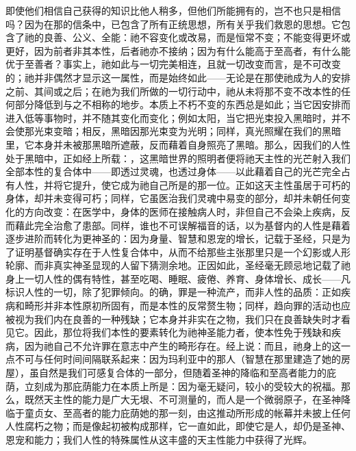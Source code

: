 即使他们相信自己获得的知识比他人稍多，但他们所能拥有的，岂不也只是相信吗？因为在那的信条中，已包含了所有正统思想，所有关乎我们救恩的思想。它包含了祂的良善、公义、全能：祂不容变化或改易，而是恒常不变；不能变得更坏或更好，因为前者非其本性，后者祂亦不接纳；因为有什么能高于至高者，有什么能优于至善者？事实上，祂如此与一切完美相连，且就一切改变而言，是不可改变的；祂并非偶然才显示这一属性，而是始终如此——无论是在那使祂成为人的安排之前、其间或之后；在祂为我们所做的一切行动中，祂从未将那不变不改本性的任何部分降低到与之不相称的地步。本质上不朽不变的东西总是如此；当它因安排而进入低等事物时，并不随其变化而变化；例如太阳，当它把光束投入黑暗时，并不会使那光束变暗；相反，黑暗因那光束变为光明；同样，真光照耀在我们的黑暗里，它本身并未被那黑暗所遮蔽，反而藉着自身照亮了黑暗。那么，因我们的人性处于黑暗中，正如经上所载：，这黑暗世界的照明者便将祂天主性的光芒射入我们全部本性的复合体中——即透过灵魂，也透过身体——以此藉着自己的光芒完全占有人性，并将它提升，使它成为祂自己所是的那一位。正如这天主性虽居于可朽的身体，却并未变得可朽；同样，它虽医治我们灵魂中易变的部分，却并未朝任何变化的方向改变：在医学中，身体的医师在接触病人时，非但自己不会染上疾病，反而藉此完全治愈了患部。同样，谁也不可误解福音的话，以为基督内的人性是藉着逐步进阶而转化为更神圣的：因为身量、智慧和恩宠的增长，记载于圣经，只是为了证明基督确实存在于人性复合体中，从而不给那些主张那里只是一个幻影或人形轮廓、而非真实神圣显现的人留下猜测余地。正因如此，圣经毫无顾忌地记载了祂身上一切人性的偶有特性，甚至吃喝、睡眠、疲倦、养育、身体增长、成长——凡标识人性的一切，除了犯罪倾向。的确，罪是一种流产，而非人性的品质：正如疾病和畸形并非本性原初所固有，而是本性的反常赘生物；同样，趋向罪的活动也应被视为我们内在良善的一种残缺；它本身并非实在之物，我们只在良善缺失时才看见它。因此，那位将我们本性的要素转化为祂神圣能力者，使本性免于残缺和疾病，因为祂自己不允许罪在意志中产生的畸形存在。经上说：而且，祂身上的这一点不可与任何时间间隔联系起来：因为玛利亚中的那人（智慧在那里建造了她的房屋），虽自然是我们可感复合体的一部分，但随着圣神的降临和至高者能力的庇荫，立刻成为那庇荫能力在本质上所是：因为毫无疑问，较小的受较大的祝福。那么，既然天主性的能力是广大无垠、不可测量的，而人是一个微弱原子，在圣神降临于童贞女、至高者的能力庇荫她的那一刻，由这推动所形成的帐幕并未披上任何人性腐朽之物；而是像起初被构成那样，它一直如此，即使它是人，却仍是圣神、恩宠和能力；我们人性的特殊属性从这丰盛的天主性能力中获得了光辉。\par

